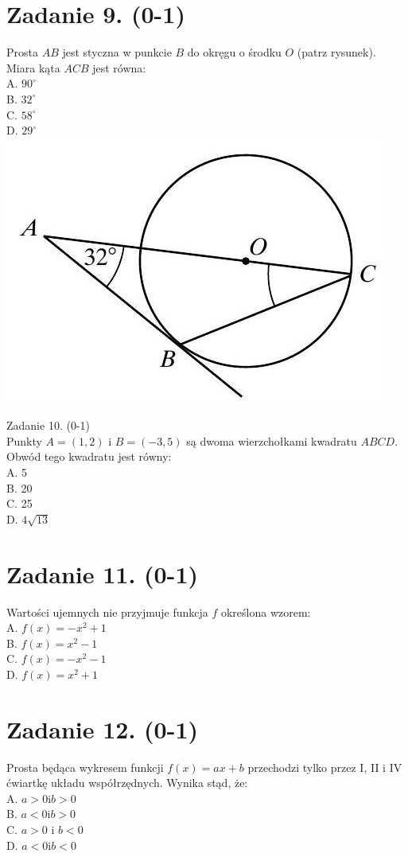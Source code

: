 \documentclass[10pt]{article}
\begin{document}
\section*{Zadanie 9. (0-1)}
Prosta \(A B\) jest styczna w punkcie \(B\) do okręgu o środku \(O\) (patrz rysunek).\\
Miara kąta \(A C B\) jest równa:\\
A. \(90^{\circ}\)\\
B. \(32^{\circ}\)\\
C. \(58^{\circ}\)\\
D. \(29^{\circ}\)\\
\includegraphics[max width=\textwidth, center]{2024_11_21_6574e892c2387ce90f12g-04}

Zadanie 10. (0-1)\\
Punkty \(A=(1,2)\) i \(B=(-3,5)\) są dwoma wierzchołkami kwadratu \(A B C D\). Obwód tego kwadratu jest równy:\\
A. 5\\
B. 20\\
C. 25\\
D. \(4 \sqrt{13}\)

\section*{Zadanie 11. (0-1)}
Wartości ujemnych nie przyjmuje funkcja \(f\) określona wzorem:\\
A. \(f(x)=-x^{2}+1\)\\
B. \(f(x)=x^{2}-1\)\\
C. \(f(x)=-x^{2}-1\)\\
D. \(f(x)=x^{2}+1\)

\section*{Zadanie 12. (0-1)}
Prosta będąca wykresem funkcji \(f(x)=a x+b\) przechodzi tylko przez I, II i IV ćwiartkę układu współrzędnych. Wynika stąd, że:\\
A. \(a>0 \mathrm{i} b>0\)\\
B. \(a<0 \mathrm{i} b>0\)\\
C. \(a>0\) i \(b<0\)\\
D. \(a<0 \mathrm{i} b<0\)
\end{document}
